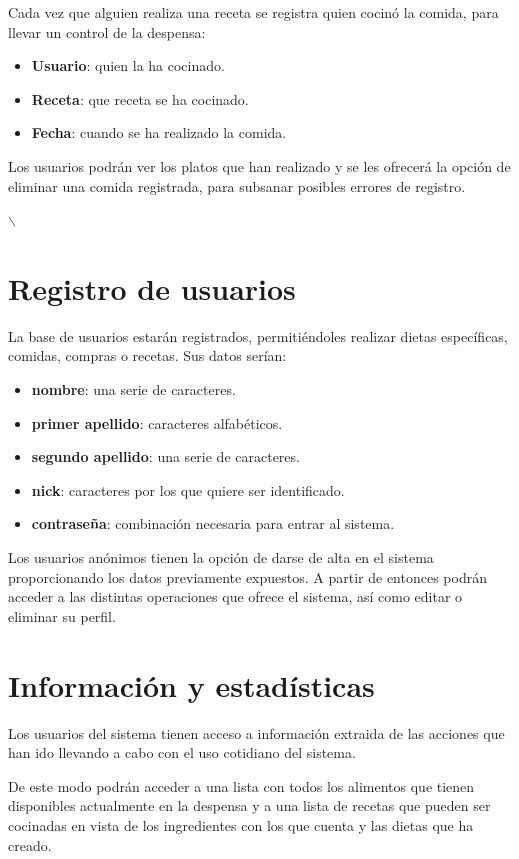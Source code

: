 \documentclass[a4paper,12pt]{report}
\begin{document}
Cada vez que alguien realiza una receta se registra quien cocinó la
comida, para llevar un control de la despensa:
\begin{itemize}
\item \textbf{Usuario}: quien la ha cocinado.
\item \textbf{Receta}: que receta se ha cocinado.
\item \textbf{Fecha}: cuando se ha realizado la comida.
\end{itemize}

\vspace{0.2cm}
Los usuarios podrán ver los platos que han realizado y se les
ofrecerá la opción de eliminar una comida registrada, para subsanar
posibles errores de registro.

$\backslash$\newpage

\section{Registro de usuarios}
\label{sec-1-3}
La base de usuarios estarán registrados, permitiéndoles realizar
dietas específicas, comidas, compras o recetas. Sus datos serían:
\begin{itemize}
\item \textbf{nombre}: una serie de caracteres.
\item \textbf{primer apellido}: caracteres alfabéticos.
\item \textbf{segundo apellido}:  una serie de caracteres.
\item \textbf{nick}: caracteres por los que quiere ser identificado.
\item \textbf{contraseña}: combinación necesaria para entrar al sistema.
\end{itemize}

\vspace{0.2cm}
Los usuarios anónimos tienen la opción de darse de alta en el
sistema proporcionando los datos previamente expuestos. A partir de
entonces podrán acceder a las distintas operaciones que ofrece el
sistema, así como editar o eliminar su perfil.


\section{Información y estadísticas}
\label{sec-1-4}
Los usuarios del sistema tienen acceso a información extraida de
las acciones que han ido llevando a cabo con el uso cotidiano del
sistema.

De este modo podrán acceder a una lista con todos los alimentos que
tienen disponibles actualmente en la despensa y a una lista de
recetas que pueden ser cocinadas en vista de los ingredientes con
los que cuenta y las dietas que ha creado.
\end{document}
